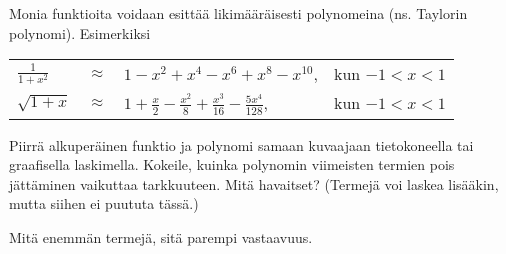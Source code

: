 \begin{tehtava}
	Monia funktioita voidaan esittää likimääräisesti polynomeina (ns.
Taylorin polynomi). Esimerkiksi

	\begin{tabular}{lcll}
	$\frac{1}{1+x^2}$ &$\approx$ & $1-x^2+x^4-x^6+x^8-x^{10}$, & kun
$-1<x<1$ \\
	$\sqrt{1+x}$ & $\approx $ & $ 1+\frac{x}{2}
	-\frac{x^2}{8}+\frac{x^3}{16}-\frac{5x^4}{128}$, & kun $-1<x<1$
	\end{tabular}

	Piirrä alkuperäinen funktio ja polynomi samaan kuvaajaan tietokoneella
tai graafisella laskimella. Kokeile, kuinka polynomin viimeisten termien pois
jättäminen vaikuttaa tarkkuuteen. Mitä havaitset? (Termejä voi laskea lisääkin,
mutta siihen ei puututa tässä.)

	\begin{vastaus}
		Mitä enemmän termejä, sitä parempi vastaavuus.
	\end{vastaus}
\end{tehtava}
